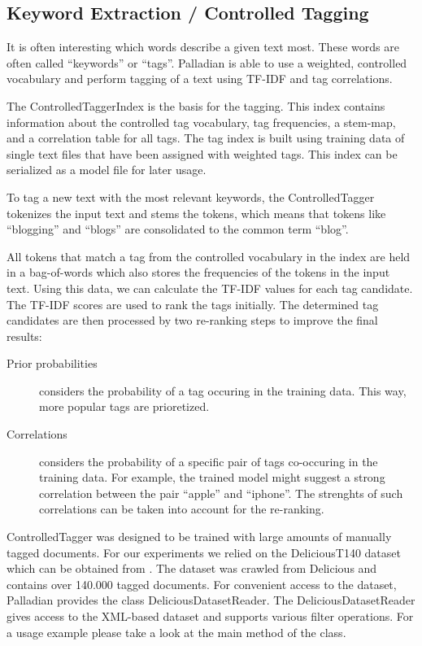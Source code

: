 \subsection{Keyword Extraction / Controlled Tagging}
It is often interesting which words describe a given text most. These words are often called ``keywords'' or ``tags''. Palladian is able to use a weighted, controlled vocabulary and perform tagging of a text using TF-IDF and tag correlations.

The ControlledTaggerIndex is the basis for the tagging. This index contains information about the controlled tag vocabulary, tag frequencies, a stem-map, and a correlation table for all tags. The tag index is built using training data of single text files that have been assigned with weighted tags. This index can be serialized as a model file for later usage.

To tag a new text with the most relevant keywords, the ControlledTagger tokenizes the input text and stems the tokens, which means that tokens like ``blogging'' and ``blogs'' are consolidated to the common term ``blog''.

All tokens that match a tag from the controlled vocabulary in the index are held in a bag-of-words which also stores the frequencies of the tokens in the input text. Using this data, we can calculate the TF-IDF values for each tag candidate. The TF-IDF scores are used to rank the tags initially. The determined tag candidates are then processed by two re-ranking steps to improve the final results:

\begin{description}

	\item [Prior probabilities] considers the probability of a tag occuring in the training data. This way, more popular tags are prioretized.

	\item [Correlations] considers the probability of a specific pair of tags co-occuring in the training data. For example, the trained model might suggest a strong correlation between the pair ``apple'' and ``iphone''. The strenghts of such correlations can be taken into account for the re-ranking.

\end{description}


ControlledTagger was designed to be trained with large amounts of manually tagged documents. For our experiments we relied on the DeliciousT140 dataset which can be obtained from \cite{deliciousT140}. The dataset was crawled from Delicious and contains over 140.000 tagged documents. For convenient access to the dataset, Palladian provides the class DeliciousDatasetReader. The DeliciousDatasetReader gives access to the XML-based dataset and supports various filter operations. For a usage example please take a look at the main method of the class.

